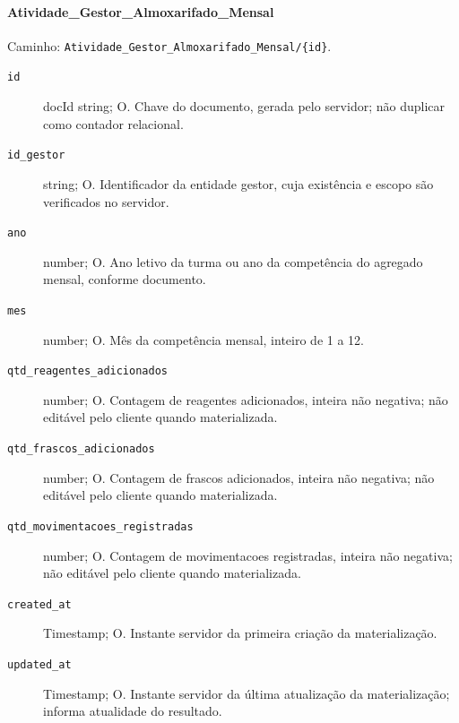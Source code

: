 \paragraph{Atividade\_Gestor\_Almoxarifado\_Mensal}\mbox{}\par
Caminho: \texttt{Atividade\_Gestor\_Almoxarifado\_Mensal/\{id\}}.
\begin{description}
\item[\texttt{id}] docId string; O. Chave do documento, gerada pelo servidor; não duplicar como contador relacional.
\item[\texttt{id\_gestor}] string; O. Identificador da entidade gestor, cuja existência e escopo são verificados no servidor.
\item[\texttt{ano}] number; O. Ano letivo da turma ou ano da competência do agregado mensal, conforme documento.
\item[\texttt{mes}] number; O. Mês da competência mensal, inteiro de 1 a 12.
\item[\texttt{qtd\_reagentes\_adicionados}] number; O. Contagem de reagentes adicionados, inteira não negativa; não editável pelo cliente quando materializada.
\item[\texttt{qtd\_frascos\_adicionados}] number; O. Contagem de frascos adicionados, inteira não negativa; não editável pelo cliente quando materializada.
\item[\texttt{qtd\_movimentacoes\_registradas}] number; O. Contagem de movimentacoes registradas, inteira não negativa; não editável pelo cliente quando materializada.
\item[\texttt{created\_at}] Timestamp; O. Instante servidor da primeira criação da materialização.
\item[\texttt{updated\_at}] Timestamp; O. Instante servidor da última atualização da materialização; informa atualidade do resultado.
\end{description}

